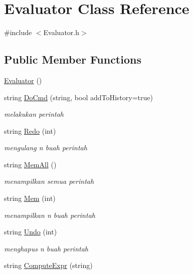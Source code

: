 \hypertarget{class_evaluator}{\section{Evaluator Class Reference}
\label{class_evaluator}
}


{\ttfamily \#include $<$Evaluator.\-h$>$}

\subsection*{Public Member Functions}
\begin{DoxyCompactItemize}
\item 
\hyperlink{class_evaluator_ab0fae467aa1c3870f9cfb0c8368710be}{Evaluator} ()
\item 
string \hyperlink{class_evaluator_a2b676b6f20467704c56df20b31cff5b3}{Do\-Cmd} (string, bool add\-To\-History=true)
\begin{DoxyCompactList}\small\item\em melakukan perintah \end{DoxyCompactList}\item 
string \hyperlink{class_evaluator_afcc41151e1e6ad0d07bbb4224dd74629}{Redo} (int)
\begin{DoxyCompactList}\small\item\em mengulang n buah perintah \end{DoxyCompactList}\item 
string \hyperlink{class_evaluator_ab2c3addba566d6259b99def095bbbc5d}{Mem\-All} ()
\begin{DoxyCompactList}\small\item\em menampilkan semua perintah \end{DoxyCompactList}\item 
string \hyperlink{class_evaluator_a4ceb00f94149585a46cc35ef41928899}{Mem} (int)
\begin{DoxyCompactList}\small\item\em menampilkan n buah perintah \end{DoxyCompactList}\item 
string \hyperlink{class_evaluator_ad82d60da69a7c7a1189778e0032c4a73}{Undo} (int)
\begin{DoxyCompactList}\small\item\em menghapus n buah perintah \end{DoxyCompactList}\item 
string \hyperlink{class_evaluator_aeb82037e6e511050a4e7511b765e990a}{Compute\-Expr} (string)

\end{DoxyCompactItemize}
